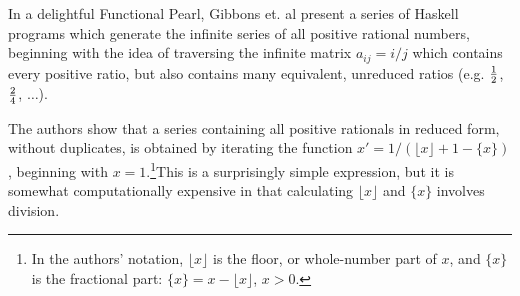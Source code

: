 In a delightful Functional Pearl, Gibbons et. al\cite{gibbons} present a series of Haskell programs which generate the infinite series of all positive rational numbers, beginning with the idea of traversing the infinite matrix $a_{ij} = i/j$ which contains every positive ratio, but also contains many equivalent, unreduced ratios (e.g. $\nicefrac{1}{2}$, $\nicefrac{2}{4}$, $\dots$).

The authors show that a series containing all positive rationals in reduced form, without duplicates, is obtained by iterating the function 
$x' = 1/{(\lfloor x \rfloor + 1 - \{x\})}$, beginning with $x=1$.\footnote{In the authors' notation, $\lfloor x \rfloor$ is the floor, or whole-number part of $x$, and $\{x\}$ is the fractional part: $\{x\} = x - \lfloor x \rfloor$, $x > 0$.}This is a surprisingly simple expression, but it is somewhat computationally expensive in that calculating $\lfloor x \rfloor$ and $\{x\}$ involves division.

